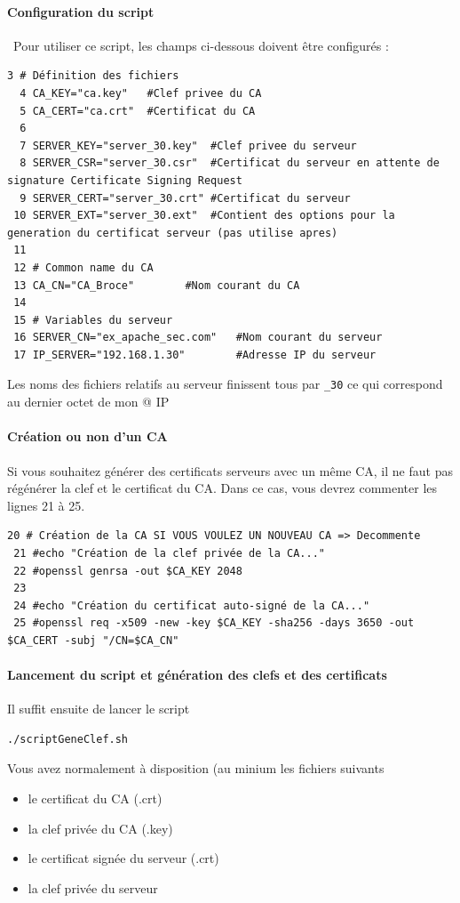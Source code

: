 \documentclass[french, 12pt]{article}%
\newcommand{\itemE}{\item[$\bullet$]}
\begin{document}
\paragraph{Configuration du script} \ 
Pour utiliser ce script, les champs ci-dessous doivent être configurés : 

\begin{lstlisting}[style=commande]
  3 # Définition des fichiers
  4 CA_KEY="ca.key"   #Clef privee du CA
  5 CA_CERT="ca.crt"  #Certificat du CA
  6 
  7 SERVER_KEY="server_30.key"  #Clef privee du serveur
  8 SERVER_CSR="server_30.csr"  #Certificat du serveur en attente de signature Certificate Signing Request
  9 SERVER_CERT="server_30.crt" #Certificat du serveur
 10 SERVER_EXT="server_30.ext"  #Contient des options pour la generation du certificat serveur (pas utilise apres)
 11 
 12 # Common name du CA
 13 CA_CN="CA_Broce"        #Nom courant du CA
 14 
 15 # Variables du serveur
 16 SERVER_CN="ex_apache_sec.com"   #Nom courant du serveur
 17 IP_SERVER="192.168.1.30"        #Adresse IP du serveur    
\end{lstlisting}

Les noms des fichiers relatifs au serveur finissent tous par \verb?_30? ce qui correspond au dernier octet de mon @ IP 


\paragraph{Création ou non d'un CA}
Si vous souhaitez générer des certificats serveurs avec un même CA, il ne faut pas régénérer la clef et le certificat du CA. Dans ce cas, vous devrez commenter les lignes 21 à 25.

\begin{lstlisting}[style=commande]
 20 # Création de la CA SI VOUS VOULEZ UN NOUVEAU CA => Decommente
 21 #echo "Création de la clef privée de la CA..."
 22 #openssl genrsa -out $CA_KEY 2048
 23 
 24 #echo "Création du certificat auto-signé de la CA..."
 25 #openssl req -x509 -new -key $CA_KEY -sha256 -days 3650 -out $CA_CERT -subj "/CN=$CA_CN"

\end{lstlisting}


\paragraph{Lancement du script et génération des clefs et des certificats}
Il suffit ensuite de lancer le script

\begin{lstlisting}[style=commande]
./scriptGeneClef.sh 
\end{lstlisting}
Vous avez normalement à disposition (au minium les fichiers suivants 
\begin{itemize}
\itemE le certificat du CA (.crt)
\itemE la clef privée du CA (.key)
\itemE le certificat signée du serveur (.crt)
\itemE la clef privée du serveur
\end{itemize}
\end{document}
